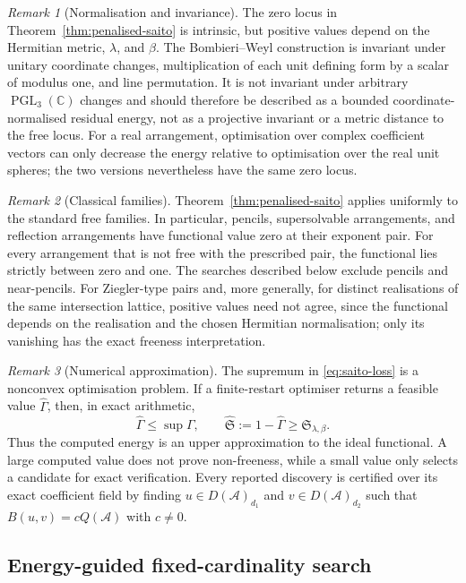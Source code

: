 \documentclass[pdflatex,sn-mathphys-num]{sn-jnl}%
\theoremstyle{remark}
\newtheorem{remark}{Remark}
\theoremstyle{definition}
\begin{document}
\begin{remark}[Normalisation and invariance]
The zero locus in Theorem~\ref{thm:penalised-saito} is intrinsic, but positive values depend on the Hermitian metric, $\lambda$, and $\beta$. The Bombieri--Weyl construction is invariant under unitary coordinate changes, multiplication of each unit defining form by a scalar of modulus one, and line permutation. It is not invariant under arbitrary $\operatorname{PGL}_3(\mathbb C)$ changes and should therefore be described as a bounded coordinate-normalised residual energy, not as a projective invariant or a metric distance to the free locus. For a real arrangement, optimisation over complex coefficient vectors can only decrease the energy relative to optimisation over the real unit spheres; the two versions nevertheless have the same zero locus.
\end{remark}
\begin{remark}[Classical families]
Theorem~\ref{thm:penalised-saito} applies uniformly to the standard free
families. In particular, pencils, supersolvable arrangements, and reflection
arrangements have functional value zero at their exponent pair. For every
arrangement that is not free with the prescribed pair, the functional lies
strictly between zero and one. The searches described below exclude pencils
and near-pencils. For Ziegler-type pairs and, more generally, for distinct
realisations of the same intersection lattice, positive values need not
agree, since the functional depends on the realisation and the chosen
Hermitian normalisation; only its vanishing has the exact freeness
interpretation.
\end{remark}
\begin{remark}[Numerical approximation]
The supremum in \eqref{eq:saito-loss} is a nonconvex optimisation problem. If a finite-restart optimiser returns a feasible value $\widehat\Gamma$, then, in exact arithmetic,
\[
\widehat\Gamma\leq\sup\Gamma,
\qquad
\widehat{\mathfrak S}:=1-\widehat\Gamma
\geq\mathfrak S_{\lambda,\beta}.
\]
Thus the computed energy is an upper approximation to the ideal functional. A large computed value does not prove non-freeness, while a small value only selects a candidate for exact verification. Every reported discovery is certified over its exact coefficient field by finding
$u\in D(\mathcal{A})_{d_1}$ and $v\in D(\mathcal{A})_{d_2}$ such that $B(u,v)=cQ({\mathcal{A}})$ with $c\neq0$.
\end{remark}

\subsection{Energy-guided fixed-cardinality search}
\label{subsec:sequential-construction}
\end{document}
